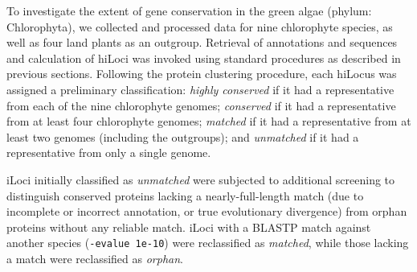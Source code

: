 To investigate the extent of gene conservation in the green algae (phylum: Chlorophyta), we collected and processed data for nine chlorophyte species, as well as four land plants as an outgroup.
Retrieval of annotations and sequences and calculation of hiLoci was invoked using standard procedures as described in previous sections.
Following the protein clustering procedure, each hiLocus was assigned a preliminary classification: \textit{highly conserved} if it had a representative from each of the nine chlorophyte genomes; \textit{conserved} if it had a representative from at least four chlorophyte genomes; \textit{matched} if it had a representative from at least two genomes (including the outgroups); and \textit{unmatched} if it had a representative from only a single genome.

iLoci initially classified as \textit{unmatched} were subjected to additional screening to distinguish conserved proteins lacking a nearly-full-length match (due to incomplete or incorrect annotation, or true evolutionary divergence) from orphan proteins without any reliable match.
iLoci with a BLASTP match against another species (\texttt{-evalue 1e-10}) were reclassified as \textit{matched}, while those lacking a match were reclassified as \textit{orphan}.


